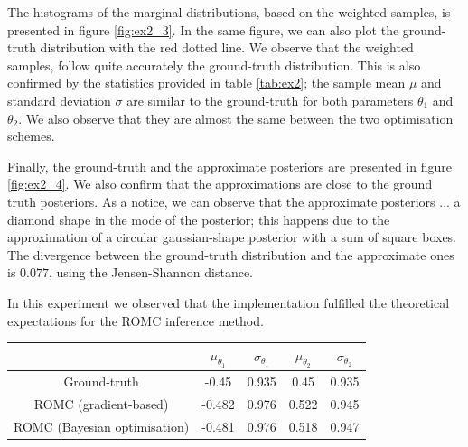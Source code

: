 The histograms of the marginal distributions, based on the weighted
samples, is presented in figure \ref{fig:ex2_3}. In the same figure,
we can also plot the ground-truth distribution with the red dotted
line. We observe that the weighted samples, follow quite accurately
the ground-truth distribution. This is also confirmed by the
statistics provided in table \ref{tab:ex2}; the sample mean $\mu$ and
standard deviation $\sigma$ are similar to the ground-truth for both
parameters $\theta_1$ and $\theta_2$. We also observe that they are
almost the same between the two optimisation schemes.

Finally, the ground-truth and the approximate posteriors are presented
in figure \ref{fig:ex2_4}. We also confirm that the approximations are
close to the ground truth posteriors. As a notice, we can observe that
the approximate posteriors ... a diamond shape in the mode of the
posterior; this happens due to the approximation of a circular
gaussian-shape posterior with a sum of square boxes.  The divergence
between the ground-truth distribution and the approximate ones is
$0.077$, using the Jensen-Shannon distance.

In this experiment we observed that the implementation fulfilled the
theoretical expectations for the ROMC inference method.

\begin{center} \label{tab:ex2}
\begin{tabular}{ c|c|c|c|c }
\hline
& $\mu_{\theta_1}$ & $\sigma_{\theta_1}$ & $\mu_{\theta_2}$ & $\sigma_{\theta_2}$ \\
\hline \hline
Ground-truth & -0.45 & 0.935 & 0.45 & 0.935 \\
\hline
ROMC (gradient-based) & -0.482 & 0.976 & 0.522 & 0.945 \\
\hline
ROMC (Bayesian optimisation) & -0.481 & 0.976 & 0.518 & 0.947 \\
\hline
\end{tabular}
\end{center}


